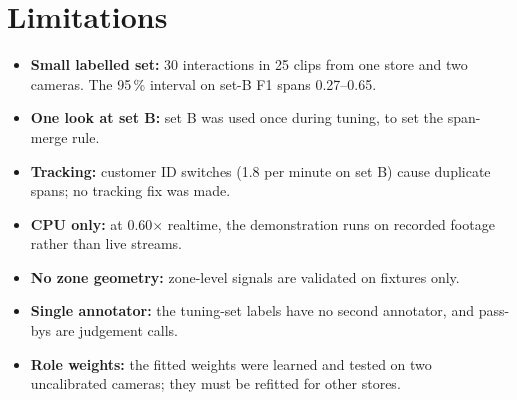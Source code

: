 \section{Limitations}
\label{sec:cveval-limits}
\begin{itemize}
\item \textbf{Small labelled set:} 30 interactions in 25 clips from one store and two cameras. The 95\,\% interval on set-B F1 spans 0.27--0.65.
\item \textbf{One look at set B:} set B was used once during tuning, to set the span-merge rule.
\item \textbf{Tracking:} customer ID switches (1.8 per minute on set B) cause duplicate spans; no tracking fix was made.
\item \textbf{CPU only:} at 0.60$\times$ realtime, the demonstration runs on recorded footage rather than live streams.
\item \textbf{No zone geometry:} zone-level signals are validated on fixtures only.
\item \textbf{Single annotator:} the tuning-set labels have no second annotator, and pass-bys are judgement calls.
\item \textbf{Role weights:} the fitted weights were learned and tested on two uncalibrated cameras; they must be refitted for other stores.
\end{itemize}
